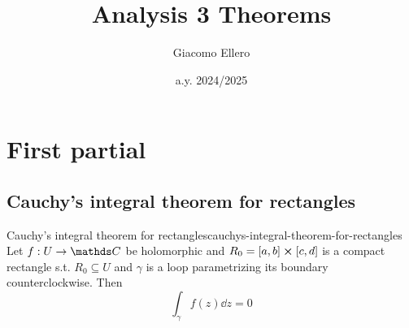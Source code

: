 \documentclass[12pt]{extarticle}
\title{Analysis 3 Theorems}
\author{Giacomo Ellero}
\date{a.y. 2024/2025}
\numberwithin{equation}{subsection}
\begin{document}
\section{First partial}

\subsection{Cauchy's integral theorem for rectangles}

\begin{theorem}{Cauchy's integral theorem for rectangles}{cauchys-integral-theorem-for-rectangles}
	Let $f: U \to \C$ be holomorphic and $R_0 = [a, b] \cross [c, d]$ is a compact rectangle s.t.
	$R_0 \subseteq U$ and $\gamma$ is a loop parametrizing its boundary counterclockwise.
	Then
	\begin{equation}
		\int_\gamma f(z) \dd z = 0
	\end{equation}
\end{theorem}
\end{document}
